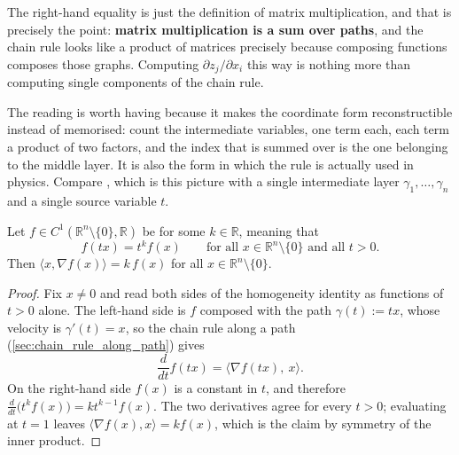 \begin{remark}
The right-hand equality is just the definition of matrix multiplication, and that is precisely the
point: \textbf{matrix multiplication is a sum over paths}, and the chain rule looks like a product of
matrices precisely because composing functions composes those graphs. Computing
$\partial z_j/\partial x_i$ this way is nothing more than computing single components of the
chain rule.

The reading is worth having because it makes the coordinate form reconstructible instead of
memorised: count the intermediate variables, one term each, each term a product of two factors,
and the index that is summed over is the one belonging to the middle layer. It is also the
form in which the rule is actually used in physics. Compare
, which is this picture with a single intermediate layer
$\gamma_1,\dots,\gamma_n$ and a single source variable $t$.
\end{remark}

\begin{theorem}
\label{thm:eulers_homogeneous_function_theorem}
Let $f \in C^1(\mathbb{R}^n\setminus\{0\},\mathbb{R})$ be  for some $k \in \mathbb{R}$, meaning that
\[f(tx) = t^kf(x) \qquad \text{for all } x \in \mathbb{R}^n\setminus\{0\} \text{ and all } t>0.\]
Then $\langle x, \nabla f(x)\rangle = k\,f(x)$ for all $x \in \mathbb{R}^n\setminus\{0\}$.
\end{theorem}

\begin{proof}
Fix $x \neq 0$ and read both sides of the homogeneity identity as functions of $t>0$ alone. The
left-hand side is $f$ composed with the path $\gamma(t) := tx$, whose velocity is
$\gamma'(t) = x$, so the chain rule along a path (\cref{sec:chain_rule_along_path}) gives
\[\frac{d}{dt}f(tx) = \big\langle \nabla f(tx),\ x\big\rangle.\]
On the right-hand side $f(x)$ is a constant in $t$, and therefore
$\frac{d}{dt}\big(t^kf(x)\big) = kt^{k-1}f(x)$. The two derivatives agree for every $t>0$;
evaluating at $t=1$ leaves $\langle \nabla f(x), x\rangle = k f(x)$, which is the claim by
symmetry of the inner product.
\end{proof}

